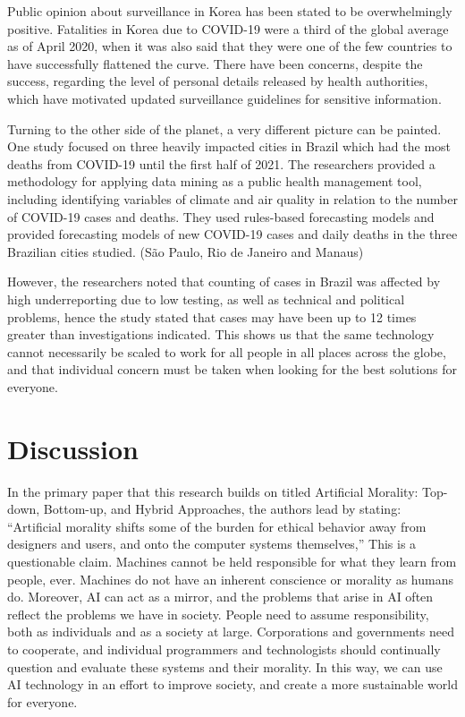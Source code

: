 \documentclass{svproc}
\begin{document}
Public opinion about surveillance in Korea has been stated to be overwhelmingly positive. Fatalities in Korea due to COVID-19 were a third of the global average as of April 2020, when it was also said that they were one of the few countries to have successfully flattened the curve. There have been concerns, despite the success, regarding the level of personal details released by health authorities, which have motivated updated surveillance guidelines for sensitive information. \cite{Fendos2020HowResponse}

Turning to the other side of the planet, a very different picture can be painted. One study focused on three heavily impacted cities in Brazil which had the most deaths from COVID-19 until the first half of 2021. The researchers provided a methodology for applying data mining as a public health management tool, including identifying variables of climate and air quality in relation to the number of COVID-19 cases and deaths. They used rules-based forecasting models and provided forecasting models of new COVID-19 cases and daily deaths in the three Brazilian cities studied. (São Paulo, Rio de Janeiro and Manaus) \cite{Barcellos2021DataMetropolis}

However, the researchers noted that counting of cases in Brazil was affected by high underreporting due to low testing, as well as technical and political problems, hence the study stated that cases may have been up to 12 times greater than investigations indicated. \cite{Barcellos2021DataMetropolis} This shows us that the same technology cannot necessarily be scaled to work for all people in all places across the globe, and that individual concern must be taken when looking for the best solutions for everyone. 

\section{Discussion
}
In the primary paper that this research builds on titled Artificial Morality: Top-down, Bottom-up, and Hybrid Approaches, the authors lead by stating: “Artiﬁcial morality shifts some of the burden for ethical behavior away from designers and users, and onto the computer systems themselves,” \cite{Allen2005ArtificialApproaches} This is a questionable claim. Machines cannot be held responsible for what they learn from people, ever. Machines do not have an inherent conscience or morality as humans do. Moreover, AI can act as a mirror, and the problems that arise in AI often reflect the problems we have in society. People need to assume responsibility, both as individuals and as a society at large. Corporations and governments need to cooperate, and individual programmers and technologists should continually question and evaluate these systems and their morality. In this way, we can use AI technology in an effort to improve society, and create a more sustainable world for everyone. 
\end{document}

